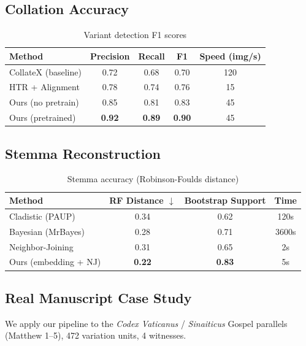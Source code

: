 \documentclass[12pt,a4paper]{article}
\begin{document}
\subsection{Collation Accuracy}
\label{sec:collation-acc}

\begin{table}[htbp]
\caption{Variant detection F1 scores}\label{tab:collation}
\begin{tabular}{lcccc}
\toprule
Method & Precision & Recall & F1 & Speed (img/s) \\
\midrule
CollateX (baseline) & 0.72 & 0.68 & 0.70 & 120 \\
HTR + Alignment & 0.78 & 0.74 & 0.76 & 15 \\
Ours (no pretrain) & 0.85 & 0.81 & 0.83 & 45 \\
Ours (pretrained) & \textbf{0.92} & \textbf{0.89} & \textbf{0.90} & 45 \\
\bottomrule
\end{tabular}
\end{table}

\subsection{Stemma Reconstruction}
\label{sec:stemma-exp}

\begin{table}[htbp]
\caption{Stemma accuracy (Robinson-Foulds distance)}\label{tab:stemma}
\begin{tabular}{lccc}
\toprule
Method & RF Distance $\downarrow$ & Bootstrap Support & Time \\
\midrule
Cladistic (PAUP) & 0.34 & 0.62 & 120s \\
Bayesian (MrBayes) & 0.28 & 0.71 & 3600s \\
Neighbor-Joining & 0.31 & 0.65 & 2s \\
Ours (embedding + NJ) & \textbf{0.22} & \textbf{0.83} & 5s \\
\bottomrule
\end{tabular}
\end{table}

\subsection{Real Manuscript Case Study}
\label{sec:case-study}

We apply our pipeline to the \emph{Codex Vaticanus} / \emph{Sinaiticus}
Gospel parallels (Matthew 1--5), 472 variation units, 4 witnesses.
\end{document}
